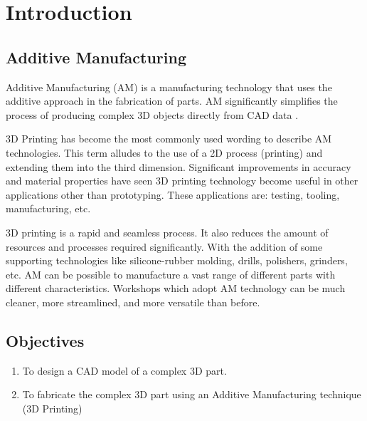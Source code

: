 \chapter{Introduction}
\label{sec:introduction}
\section{Additive Manufacturing}
Additive Manufacturing (AM) is a manufacturing technology that uses the additive approach in the fabrication of parts. AM significantly
simplifies the process of producing complex 3D objects directly from CAD data .

3D Printing has become the most commonly used wording to describe AM technologies. This term alludes to the use of a 2D process (printing) and extending them into the third dimension. Significant improvements in accuracy and material properties have seen 3D printing
technology become useful in other applications other than prototyping. These applications are: testing, tooling, manufacturing, etc. 

3D printing is a rapid and seamless process. It also reduces the amount of resources and processes required significantly. With the addition of some supporting technologies like silicone-rubber
molding, drills, polishers, grinders, etc. AM can be possible to manufacture a vast
range of different parts with different characteristics. Workshops which adopt AM
technology can be much cleaner, more streamlined, and more versatile than before.

\section{Objectives}
\begin{enumerate}
\item To design a CAD model of a complex 3D part.
\item To fabricate the complex 3D part using an Additive Manufacturing technique (3D Printing)
\end{enumerate}
